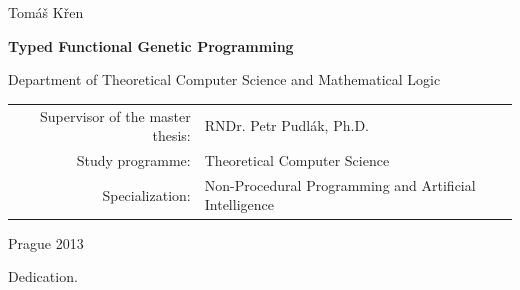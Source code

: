 \documentclass[12pt,a4paper]{report}
\begin{document}
\begin{center}
{\LARGE Tomáš Křen}

\vspace{15mm}

{\LARGE\bfseries Typed Functional Genetic Programming}

\vfill

{\fontsize{0.46cm}{1em}\selectfont 
Department of Theoretical Computer Science and Mathematical Logic}

\vfill

\begin{tabular}{rl}

Supervisor of the master thesis: & RNDr. Petr Pudlák, Ph.D. \\
\noalign{\vspace{2mm}}
Study programme: & Theoretical Computer Science \\ %
\noalign{\vspace{2mm}}
Specialization: & 
{\fontsize{0.3cm}{1em}\selectfont 
Non-Procedural Programming and Artificial Intelligence} \\
\end{tabular}

\vfill

Prague 2013

\end{center}

\newpage




\noindent
Dedication.

\newpage
\end{document}

